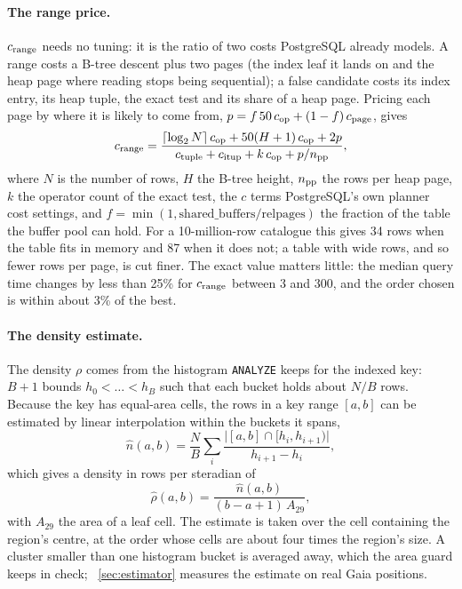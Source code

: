 \paragraph{The range price.}
\label{sec:calib}
$c_{\rm range}$ needs no tuning: it is the ratio of two costs PostgreSQL already
models. A range costs a B-tree descent plus two pages (the index leaf it lands on and
the heap page where reading stops being sequential); a false candidate costs its index
entry, its heap tuple, the exact test and its share of a heap page. Pricing each page by where it is likely to come from,
$p = f\,50\,c_{\rm op} + (1-f)\,c_{\rm page}$, gives
\begin{equation}
  c_{\rm range} = \frac{\lceil\log_2 N\rceil\,c_{\rm op} + 50(H+1)\,c_{\rm op} + 2p}
    {c_{\rm tuple} + c_{\rm itup} + k\,c_{\rm op} + p/n_{\rm pp}},
  \label{eq:crange}
\end{equation}
where $N$ is the number of rows, $H$ the B-tree height, $n_{\rm pp}$ the rows per heap
page, $k$ the operator count of the exact test, the $c$ terms PostgreSQL's own planner
cost settings, and $f=\min(1,\mathrm{shared\_buffers}/\mathrm{relpages})$ the fraction
of the table the buffer pool can hold. For a 10-million-row catalogue this gives 34 rows
when the table fits in memory and 87 when it does not; a table with wide rows, and so
fewer rows per page, is cut finer. The exact value matters little: the median query time changes by less
than 25\% for $c_{\rm range}$ between 3 and 300, and the order chosen is within about 3\%
of the best.

\paragraph{The density estimate.}
\label{sec:density}
The density $\rho$ comes from the histogram \texttt{ANALYZE} keeps for the indexed key:
$B+1$ bounds $h_0<\dots<h_B$ such that each bucket holds about $N/B$ rows. Because the
key has equal-area cells, the rows in a key range $[a,b]$ can be estimated by linear
interpolation within the buckets it spans,
\begin{equation}
  \hat{n}(a,b) = \frac{N}{B}\sum_{i} \frac{\bigl|[a,b] \cap [h_i, h_{i+1})\bigr|}{h_{i+1}-h_i},
  \label{eq:hist}
\end{equation}
which gives a density in rows per steradian of
\begin{equation}
  \hat{\rho}(a,b) = \frac{\hat{n}(a,b)}{(b-a+1)\,A_{29}},
  \label{eq:rho}
\end{equation}
with $A_{29}$ the area of a leaf cell. The estimate is taken over the cell containing the
region's centre, at the order whose cells are about four times the region's size. A
cluster smaller than one histogram bucket is averaged away, which the area guard keeps
in check; \Sect~\ref{sec:estimator} measures the estimate on real Gaia positions.

